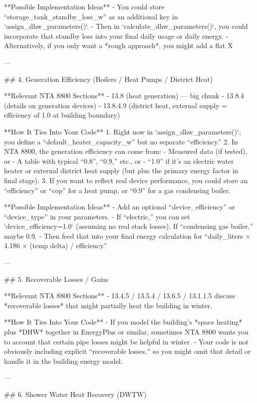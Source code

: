 **Possible Implementation Ideas**  
- You could store “storage_tank_standby_loss_w” as an additional key in `assign_dhw_parameters()`.  
- Then in `calculate_dhw_parameters()`, you could incorporate that standby loss into your final daily usage or daily energy.  
- Alternatively, if you only want a *rough approach*, you might add a flat X%

---

## 4. Generation Efficiency (Boilers / Heat Pumps / District Heat)

**Relevant NTA 8800 Sections**  
- 13.8 (heat generation) — big chunk  
- 13.8.4 (details on generation devices)  
- 13.8.4.9 (district heat, external supply = efficiency of 1.0 at building boundary)  

**How It Ties Into Your Code**  
1. Right now in `assign_dhw_parameters()`, you define a “default_heater_capacity_w” but no separate “efficiency.”  
2. In NTA 8800, the generation efficiency can come from: 
   - Measured data (if tested), or  
   - A table with typical “0.8”, “0.9,” etc., or  
   - “1.0” if it’s an electric water heater or external district heat supply (but plus the primary energy factor in final stage).  
3. If you want to reflect real device performance, you could store an “efficiency” or “cop” for a heat pump, or “0.9” for a gas condensing boiler.  

**Possible Implementation Ideas**  
- Add an optional “device_efficiency” or “device_type” in your parameters.  
- If “electric,” you can set `device_efficiency=1.0` (assuming no real stack losses). If “condensing gas boiler,” maybe 0.9.  
- Then feed that into your final energy calculation for “daily_liters × 4.186 × (temp delta) / efficiency.”  

---

## 5. Recoverable Losses / Gains

**Relevant NTA 8800 Sections**  
- 13.4.5 / 13.5.4 / 13.6.5 / 13.1.1.5 discuss *recoverable losses* that might partially heat the building in winter.  

**How It Ties Into Your Code**  
- If you model the building’s *space heating* plus *DHW* together in EnergyPlus or similar, sometimes NTA 8800 wants you to account that certain pipe losses might be helpful in winter.  
- Your code is not obviously including explicit “recoverable losses,” so you might omit that detail or handle it in the building energy model.  

---

## 6. Shower Water Heat Recovery (DWTW)

